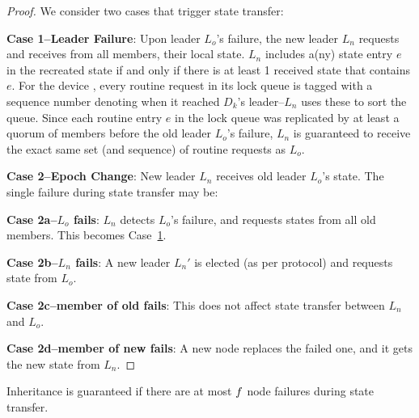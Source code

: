 \begin{proof}
\label{comesh:lemma:inheritance:proof}
We consider two cases that trigger state transfer: 

\label{comesh:lemma:inheritance:case1}
\noindent \textbf{Case 1--Leader Failure}:
Upon \kgroup{} leader $L_o$'s failure,
the new leader $L_n$ requests and receives from  all \kgroup{} members,  their local \kgroup{} state.
$L_n$ includes a(ny) state entry $e$ in the recreated state
if and only if there is at least 1 received state that contains $e$.
For the device \kgroups{},
every routine request in its lock queue is tagged with a sequence number
denoting when it reached $D_k$'s \kgroup{} leader--$L_n$ uses these to sort the queue. 
Since each routine entry $e$ in the lock queue was replicated
by at least a quorum of \kgroup{} members before the old leader $L_o$'s failure,
$L_n$ is guaranteed to receive the exact same set (and sequence) of routine requests as $L_o$.

\label{comesh:lemma:inheritance:case2}
\noindent \textbf{Case 2--Epoch Change}:
New leader $L_n$ receives old leader $L_o$'s state. The single failure during state transfer may be:

\label{comesh:lemma:inheritance:case2a}
\noindent \textbf{Case 2a--$L_o$ fails}:
$L_n$ detects $L_o$'s failure, and requests states from  all  old \kgroup{} members. This becomes Case~\hyperref[comesh:lemma:inheritance:case1]{1}. 

\label{comesh:lemma:inheritance:case2b}
\noindent \textbf{Case 2b--$L_n$ fails}: A new leader $L_n'$ is elected (as per protocol) and requests state from $L_o$.

\label{comesh:lemma:inheritance:case2c}
\noindent \textbf{Case 2c--member of old \kgroup{} fails}: This does not affect state transfer between $L_n$ and $L_o$. 

\label{comesh:lemma:inheritance:case2d}
\noindent \textbf{Case 2d--member of new \kgroup{} fails}: 
A new node replaces the failed one, and it gets the new state from $L_n$. 
\end{proof}

\begin{lemma}
\label{comesh:lemma:inheritance:extension}
Inheritance is guaranteed if there are at most $f{}$ node failures during state transfer.
\end{lemma}

